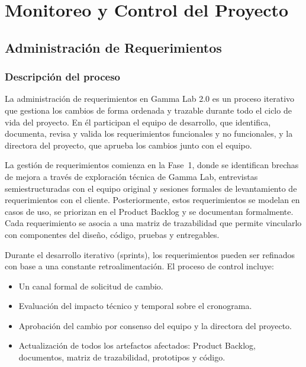 \documentclass{article}
\begin{document}
\clearpage


\section{Monitoreo y Control del Proyecto}

\subsection{Administración de Requerimientos}

\subsubsection*{Descripción del proceso}

La administración de requerimientos en Gamma Lab 2.0 es un proceso iterativo
que gestiona los cambios de forma ordenada y trazable durante todo el ciclo de
vida del proyecto. En él participan el equipo de desarrollo, que identifica,
documenta, revisa y valida los requerimientos funcionales y no funcionales, y la
directora del proyecto, que aprueba los cambios junto con el equipo.

La gestión de requerimientos comienza en la Fase~1, donde se identifican
brechas de mejora a través de exploración técnica de Gamma Lab,
entrevistas semiestructuradas con el equipo original y sesiones formales de
levantamiento de requerimientos con el cliente. Posteriormente, estos
requerimientos se modelan en casos de uso, se priorizan en el Product Backlog
y se documentan formalmente. Cada requerimiento se asocia a una matriz de
trazabilidad que permite vincularlo con componentes del diseño, código,
pruebas y entregables.

Durante el desarrollo iterativo (sprints), los requerimientos pueden ser refinados con base a una constante retroalimentación. El proceso de control incluye:

\begin{itemize}
    \item Un canal formal de solicitud de cambio.
    \item Evaluación del impacto técnico y temporal sobre el cronograma.
    \item Aprobación del cambio por consenso del equipo y la directora del proyecto.
    \item Actualización de todos los artefactos afectados: Product Backlog,
          documentos, matriz de trazabilidad, prototipos y código.
\end{itemize}
\end{document}
